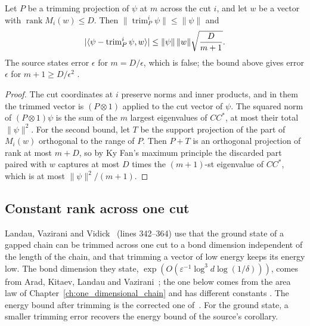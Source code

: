 \begin{lemma}
    \label{thm:chain_trim_error}
    \leanok
    Let $P$ be a trimming projection of $\psi$ at $m$ across the cut $i$,
    and let $w$ be a vector with $\operatorname{rank}M_i(w)\le D$. Then
    $\|\operatorname{trim}^i_P\psi\|\le\|\psi\|$ and
    \begin{align}
        |\langle\psi-\operatorname{trim}^i_P\psi,w\rangle|
        \le\|\psi\|\,\|w\|\sqrt{\frac{D}{m+1}}. \notag
    \end{align}
    The source states error $\epsilon$ for $m=D/\epsilon$, which is false;
    the bound above gives error $\epsilon$ for $m+1\ge D/\epsilon^2$
    \cite{gap:lvv13_trimming_radius}.
\end{lemma}
\begin{proof}\leanok
    The cut coordinates at $i$ preserve norms and inner products, and in
    them the trimmed vector is $(P\otimes1)$ applied to the cut vector of
    $\psi$. The squared norm of $(P\otimes1)\psi$ is the sum of the $m$
    largest eigenvalues of $CC^{*}$, at most their total $\|\psi\|^2$. For the
    second bound, let $T$ be the support projection of the part of $M_i(w)$
    orthogonal to the range of $P$. Then $P+T$ is an orthogonal projection of
    rank at most $m+D$, so by Ky Fan's maximum principle the discarded part
    paired with $w$ captures at most $D$ times the $(m+1)$-st eigenvalue of
    $CC^{*}$, which is at most $\|\psi\|^2/(m+1)$.
\end{proof}

\subsection{Constant rank across one cut}

Landau, Vazirani and Vidick~\cite{Landau2015Polynomial} (lines 342--364)
use that the ground state of a gapped chain can be trimmed across one cut to
a bond dimension independent of the length of the chain, and that trimming a
vector of low energy keeps its energy low. The bond dimension they state,
$\exp(O(\varepsilon^{-1}\log^3d\log(1/\delta)))$, comes from Arad, Kitaev,
Landau and Vazirani~\cite{Arad2013AreaLaw}; the one below comes from the
area law of Chapter~\ref{ch:one_dimensional_chain} and has different constants
\cite{gap:lvv13_constant_bond}. The energy bound after trimming is the
corrected one of~\cite{gap:lvv13_trimming_energy}. For the ground state, a
smaller trimming error recovers the energy bound of the source's corollary.


